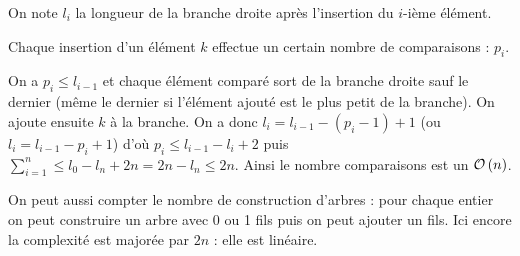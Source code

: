 \begin{Exercise}
On note $l_i$ la longueur de la branche droite après l'insertion du $i$-ième élément.

Chaque insertion d'un élément $k$ effectue un certain nombre de comparaisons : $p_i$.

On a $p_i\le l_{i-1}$ et chaque élément comparé sort de la branche droite sauf le dernier (même le dernier si l'élément ajouté est le plus petit de la branche). On ajoute ensuite $k$ à la branche. On a donc $l_i = l_{i-1} -(p_i-1)+1$ (ou $l_i = l_{i-1} -p_i+1$) d'où $p_i \le  l_{i-1}-l_i +2$ puis $\sum_{i=1}^n \le l_0-l_n+2n=2n-l_n\le 2n$. Ainsi le nombre comparaisons est un ${\cal O}\left(n\right)$.

\medskip

On peut aussi compter le nombre de construction d'arbres : pour chaque entier on peut construire un arbre avec 0 ou 1 fils puis on peut ajouter un fils. Ici encore la complexité est majorée par $2n$ : elle est linéaire.
\end{Exercise}






